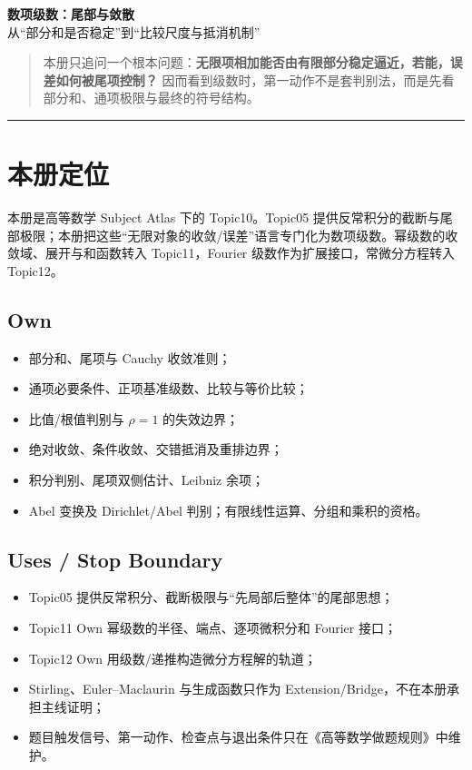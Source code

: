 \documentclass[11pt,a4paper,fontset=fandol]{ctexart}
\begin{document}
\begin{center}
{\LARGE\textbf{数项级数：尾部与敛散}}\\[0.4em]
{\large 从“部分和是否稳定”到“比较尺度与抵消机制”}
\end{center}
\vspace{0.4em}
\begin{quote}
本册只追问一个根本问题：\textbf{无限项相加能否由有限部分稳定逼近，若能，误差如何被尾项控制？} 因而看到级数时，第一动作不是套判别法，而是先看部分和、通项极限与最终的符号结构。
\end{quote}
\begin{center}\rule{0.5\linewidth}{0.5pt}\end{center}

\setcounter{section}{-1}
\section{本册定位}
本册是高等数学 Subject Atlas 下的 Topic10。Topic05 提供反常积分的截断与尾部极限；本册把这些“无限对象的收敛/误差”语言专门化为数项级数。幂级数的收敛域、展开与和函数转入 Topic11，Fourier 级数作为扩展接口，常微分方程转入 Topic12。

\subsection{Own}
\begin{itemize}
  \item 部分和、尾项与 Cauchy 收敛准则；
  \item 通项必要条件、正项基准级数、比较与等价比较；
  \item 比值/根值判别与 $\rho=1$ 的失效边界；
  \item 绝对收敛、条件收敛、交错抵消及重排边界；
  \item 积分判别、尾项双侧估计、Leibniz 余项；
  \item Abel 变换及 Dirichlet/Abel 判别；有限线性运算、分组和乘积的资格。
\end{itemize}

\subsection{Uses / Stop Boundary}
\begin{itemize}
  \item Topic05 提供反常积分、截断极限与“先局部后整体”的尾部思想；
  \item Topic11 Own 幂级数的半径、端点、逐项微积分和 Fourier 接口；
  \item Topic12 Own 用级数/递推构造微分方程解的轨道；
  \item Stirling、Euler--Maclaurin 与生成函数只作为 Extension/Bridge，不在本册承担主线证明；
  \item 题目触发信号、第一动作、检查点与退出条件只在《高等数学做题规则》中维护。
\end{itemize}
\end{document}
